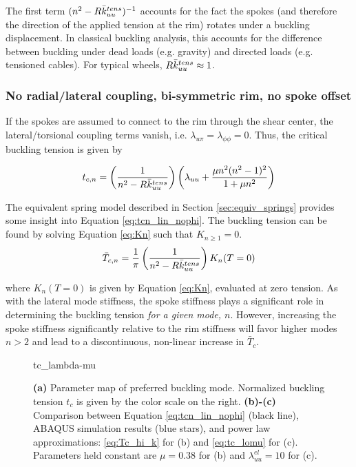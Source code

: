 \documentclass[\rootdir/thesis.tex]{subfiles}
\begin{document}
The first term $(n^2 - R\bar{k}_{uu}^{tens})^{-1}$ accounts for the fact the spokes (and therefore the direction of the applied tension at the rim) rotates under a buckling displacement. In classical buckling analysis, this accounts for the difference between buckling under dead loads (e.g. gravity) and directed loads (e.g. tensioned cables). For typical wheels, $R\bar{k}_{uu}^{tens} \approx 1$.

\subsubsection*{No radial/lateral coupling, bi-symmetric rim, no spoke offset}
If the spokes are assumed to connect to the rim through the shear center, the lateral/torsional coupling terms vanish, i.e. $\lambda_{u\pi}=\lambda_{\phi\phi}=0$. Thus, the critical buckling tension is given by

\begin{equation}
\label{eq:tcn_lin_nophi}
t_{c,n} = \left(\frac{1}{n^2 - R\bar{k}_{uu}^{tens}}\right)
\left(\lambda_{uu}
      +\frac{\mu n^2(n^2-1)^2}
        {1 + \mu n^2}\right)
\end{equation}

The equivalent spring model described in Section \ref{sec:equiv_springs} provides some insight into Equation \eqref{eq:tcn_lin_nophi}. The buckling tension can be found by solving Equation \eqref{eq:Kn} such that $K_{n\geq 1} = 0$.
\begin{equation}
\bar{T}_{c,n} = \frac{1}{\pi}\left(\frac{1}{n^2 - R\bar{k}_{uu}^{tens}}\right) K_n(T=0)
\end{equation}

where $K_n(T=0)$ is given by Equation \eqref{eq:Kn}, evaluated at zero tension. As with the lateral mode stiffness, the spoke stiffness plays a significant role in determining the buckling tension \emph{for a given mode, $n$}. However, increasing the spoke stiffness significantly relative to the rim stiffness will favor higher modes $n > 2$ and lead to a discontinuous, non-linear increase in $\bar{T}_c$.

\begin{figure}
\centering
{tc_lambda-mu}
\caption{\textbf{(a)} Parameter map of preferred buckling mode. Normalized buckling tension $t_c$ is given by the color scale on the right. \textbf{(b)-(c)} Comparison between Equation \eqref{eq:tcn_lin_nophi} (black line), ABAQUS simulation results (blue stars), and power law approximations: \eqref{eq:Tc_hi_k} for (b) and \eqref{eq:tc_lomu} for (c). Parameters held constant are $\mu=0.38$ for (b) and $\lambda_{uu}^{el}=10$ for (c).}
\label{fig:tc_lambda_mu}
\end{figure}
\end{document}
